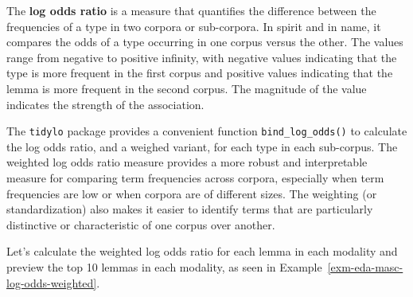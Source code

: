 \documentclass[
  letterpaper,
  DIV=11,
  numbers=noendperiod]{scrreprt}
\theoremstyle{definition}
\theoremstyle{remark}
\begin{document}
The \textbf{log odds ratio} is a measure that quantifies the difference
between the frequencies of a type in two corpora or sub-corpora. In
spirit and in name, it compares the odds of a type occurring in one
corpus versus the other. The values range from negative to positive
infinity, with negative values indicating that the type is more frequent
in the first corpus and positive values indicating that the lemma is
more frequent in the second corpus. The magnitude of the value indicates
the strength of the association.

The \texttt{tidylo} package provides a convenient function
\texttt{bind\_log\_odds()} to calculate the log odds ratio, and a
weighed variant, for each type in each sub-corpus. The weighted log odds
ratio measure provides a more robust and interpretable measure for
comparing term frequencies across corpora, especially when term
frequencies are low or when corpora are of different sizes. The
weighting (or standardization) also makes it easier to identify terms
that are particularly distinctive or characteristic of one corpus over
another.

Let's calculate the weighted log odds ratio for each lemma in each
modality and preview the top 10 lemmas in each modality, as seen in
Example~\ref{exm-eda-masc-log-odds-weighted}.
\end{document}
